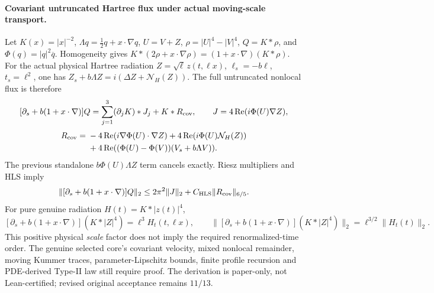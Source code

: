 \paragraph{Covariant untruncated Hartree flux under actual moving-scale transport.}
Let $K(x)=|x|^{-2}$, $\Lambda q=\frac12q+x\cdot\nabla q$,
$U=V+Z$, $\rho=|U|^4-|V|^4$, $Q=K*\rho$, and
$\Phi(q)=|q|^2\overline q$. Homogeneity gives
$K*(2\rho+x\cdot\nabla\rho)=(1+x\cdot\nabla)(K*\rho)$.
For the actual physical Hartree radiation
$Z=\sqrt\ell\,z(t,\ell x)$,
$\ell_s=-b\ell$, $t_s=\ell^2$, one has
$Z_s+b\Lambda Z=i(\Delta Z+\mathcal N_H(Z))$.
The full untruncated nonlocal flux is therefore
\[
 [\partial_s+b(1+x\cdot\nabla)]Q
 =\sum_{j=1}^3(\partial_j K)*J_j+K*R_{\rm cov},
 \qquad J=4\operatorname{Re}(i\Phi(U)\nabla Z),
\]
\[
 \begin{aligned}
 R_{\rm cov}={}&-4\operatorname{Re}(i\nabla\Phi(U)\cdot\nabla Z)
 +4\operatorname{Re}(i\Phi(U)\mathcal N_H(Z))\\
 &+4\operatorname{Re}((\Phi(U)-\Phi(V))(V_s+b\Lambda V)).
 \end{aligned}
\]
The previous standalone $b\Phi(U)\Lambda Z$ term cancels
exactly. Riesz multipliers and HLS imply
\[
 \|[\partial_s+b(1+x\cdot\nabla)]Q\|_2
 \le 2\pi^2\|J\|_2+C_{\rm HLS}\|R_{\rm cov}\|_{6/5}.
\]
For pure genuine radiation $H(t)=K*|z(t)|^4$,
\[
 [\partial_s+b(1+x\cdot\nabla)](K*|Z|^4)
 =\ell^3H_t(t,\ell x),\qquad
 \|[\partial_s+b(1+x\cdot\nabla)](K*|Z|^4)\|_2
 =\ell^{3/2}\|H_t(t)\|_2.
\]
This positive physical \emph{scale} factor does not imply the required
renormalized-time order. The genuine selected core's covariant
velocity, mixed nonlocal remainder, moving Kummer traces,
parameter-Lipschitz bounds, finite profile recursion and PDE-derived
Type-II law still require proof. The derivation is paper-only, not
Lean-certified; revised original acceptance remains $11/13$.
